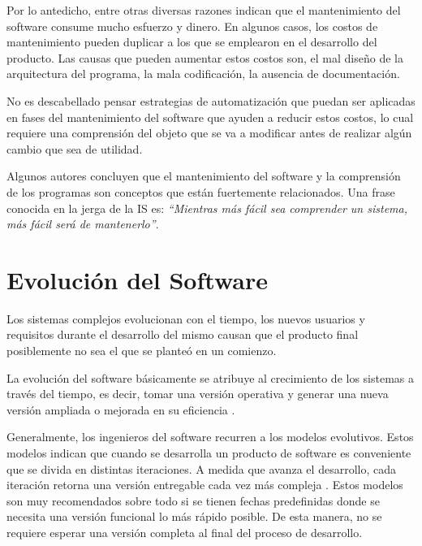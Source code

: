 
Por lo antedicho, entre otras diversas razones \cite{KBVR00,SMMH98,ALGS01,BEKH97} indican que el man\-tenimiento del software consume mucho esfuerzo y dinero. En algunos casos, los costos de mantenimiento pueden duplicar a los que se emplearon en el desarro\-llo del producto. Las causas que pueden aumentar estos costos son, el mal diseño de la arquitectura del programa, la mala codificación, la ausencia de documentación.

No es descabellado pensar estrategias de automatización que puedan ser aplicadas en fases del mantenimiento del software que ayuden a reducir estos costos, lo cual requiere una comprensión del objeto que se va a modificar antes de realizar algún cambio que sea de utilidad.
 
Algunos autores \cite{KBVR00,MAS05,RSPMGH02,PFT02} concluyen que el mantenimiento del software y la comprensión de los programas son conceptos que están fuertemente relacionados. Una frase conocida en la jerga de la IS es: \textit{“Mientras más fácil sea comprender un sistema, más fácil será de mantenerlo”}.


\section{Evolución del Software}

Los sistemas complejos evolucionan con el tiempo, los nuevos usuarios y requisitos durante el desarrollo del mismo causan que el producto final posiblemente no sea el que se planteó en un comienzo. 

La evolución del software básicamente se atribuye al crecimiento de los sistemas a través del tiempo, es decir, tomar una versión operativa y generar una nueva versión ampliada o mejorada en su eficiencia \cite{SCJH01,KBVR00,ZHGL09,WYHW10}.

Generalmente, los ingenieros del software recurren a los modelos evolutivos. Estos modelos indican que cuando se desarrolla un producto de software es conveniente que se divida en distintas iteraciones. A medida que avanza el desarrollo, cada iteración retorna una versión entregable cada vez más compleja \cite{RSPMGH02}.
Estos modelos son muy recomendados sobre todo si se tienen fechas predefinidas donde se necesita una versión funcional lo más rápido posible. De esta manera, no se requiere esperar una versión completa al final del proceso de desarrollo.

